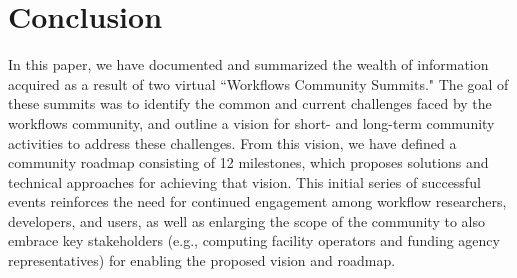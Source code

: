 \section{Conclusion}
\label{sec:conclusion}

In this paper, we have documented and summarized the wealth of information acquired as a result of two virtual ``Workflows Community Summits." The goal of these summits was to identify the common and current challenges faced by the workflows community, and outline a vision for short- and long-term community activities to address these challenges. From this vision, we have defined a community roadmap consisting of 12 milestones, which proposes solutions and technical approaches for achieving that vision. This initial series of successful events reinforces the need for continued engagement among workflow researchers, developers, and users, as well as enlarging the scope of the community to also embrace key stakeholders (e.g., computing facility operators and funding agency representatives) for enabling the proposed vision and roadmap.
